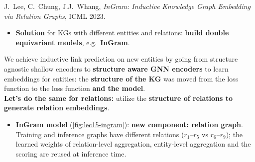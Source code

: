 J.\ Lee, C.\ Chung, J.J.\ Whang, \emph{InGram: Inductive Knowledge Graph Embedding via
Relation Graphs}, ICML 2023.
\begin{itemize}
  \item \textbf{Solution} for KGs with different entities and relations: \textbf{build
    double equivariant models}, e.g.\ \textbf{InGram}.
\end{itemize}
\begin{keyidea}[slide 47]
  We achieve inductive link prediction on new entities by going from structure agnostic
  shallow encoders to \textbf{structure aware GNN encoders} to learn embeddings for
  entities: the \textbf{structure of the KG} was moved from the loss function to the
  loss function \textbf{and the model}.\\
  \textbf{Let's do the same for relations:} utilize the \textbf{structure of relations to
  generate relation embeddings}.
\end{keyidea}
\begin{itemize}
  \item \textbf{InGram model} (\cref{fig:lec15-ingram}): \textbf{new component:
    relation graph}. Training and inference graphs have different relations
    ($r_1$--$r_5$ vs $r_6$--$r_9$); the learned weights of relation-level aggregation,
    entity-level aggregation and the scoring are reused at inference time.
\end{itemize}

